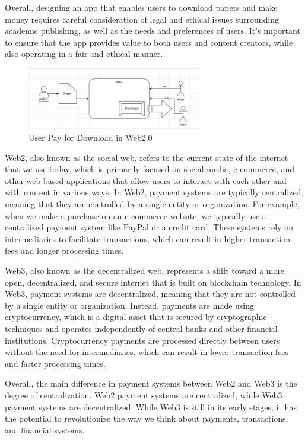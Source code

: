 \documentclass[lettersize,journal]{IEEEtran}
\begin{document}
Overall, designing an app that enables users to download papers and make money requires careful consideration of legal and ethical issues surrounding academic publishing, as well as the needs and preferences of users. It's important to ensure that the app provides value to both users and content creators, while also operating in a fair and ethical manner.

\begin{figure}[h]
  \includegraphics[width=3in]{assets/web2.png}
  \caption{User Pay for Download in Web2.0}
\end{figure}

Web2, also known as the social web, refers to the current state of the internet that we use today, which is primarily focused on social media, e-commerce, and other web-based applications that allow users to interact with each other and with content in various ways. In Web2, payment systems are typically centralized, meaning that they are controlled by a single entity or organization. For example, when we make a purchase on an e-commerce website, we typically use a centralized payment system like PayPal or a credit card. These systems rely on intermediaries to facilitate transactions, which can result in higher transaction fees and longer processing times.

Web3, also known as the decentralized web, represents a shift toward a more open, decentralized, and secure internet that is built on blockchain technology. In Web3, payment systems are decentralized, meaning that they are not controlled by a single entity or organization. Instead, payments are made using cryptocurrency, which is a digital asset that is secured by cryptographic techniques and operates independently of central banks and other financial institutions. Cryptocurrency payments are processed directly between users without the need for intermediaries, which can result in lower transaction fees and faster processing times.

Overall, the main difference in payment systems between Web2 and Web3 is the degree of centralization. Web2 payment systems are centralized, while Web3 payment systems are decentralized. While Web3 is still in its early stages, it has the potential to revolutionize the way we think about payments, transactions, and financial systems.
\end{document}
